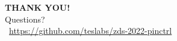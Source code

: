\documentclass[handout]{beamer}
\begin{document}
\begin{frame}[plain]{}
  \begin{center}
    \huge
    \textbf{THANK YOU!} \\
    Questions? \\
    \vspace{2.5em}
    \normalsize
    \faFilePowerpoint~\url{https://github.com/teslabs/zds-2022-pinctrl} \\
  \end{center}
\end{frame}
\end{document}
